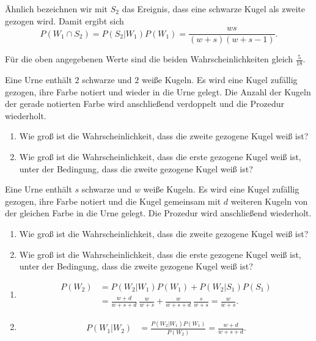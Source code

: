 Ähnlich bezeichnen wir mit $S_2$ das Ereignis, dass eine schwarze Kugel als zweite
gezogen wird. Damit ergibt sich
\begin{equation*}
    P(W_1 \cap S_2)= P(S_2 | W_1) P(W_1) = \frac{ w s }{(w+s)(w+s-1)}.
\end{equation*}

Für die oben angegebenen Werte sind die beiden Wahrscheinlichkeiten gleich
$\frac{5}{18}$.

 Eine Urne
enthält $2$ schwarze und $2$ weiße Kugeln. Es wird eine Kugel zufällig gezogen,
ihre Farbe notiert und wieder in die Urne gelegt. Die Anzahl der Kugeln der gerade notierten
Farbe wird anschließend verdoppelt und die Prozedur wiederholt. 
\begin{enumerate}
    \item Wie groß ist die Wahrscheinlichkeit, dass die zweite gezogene Kugel weiß ist?
    \item Wie groß ist die Wahrscheinlichkeit, dass die erste gezogene Kugel
        weiß ist, unter der Bedingung, dass die zweite gezogene Kugel weiß ist?
\end{enumerate}

 Eine Urne
enthält $s$ schwarze und $w$ weiße Kugeln. Es wird eine Kugel zufällig gezogen,
ihre Farbe notiert und die Kugel gemeinsam mit $d$ weiteren Kugeln von der
gleichen Farbe in die Urne gelegt. Die Prozedur wird anschließend wiederholt. 
\begin{enumerate}
    \item Wie groß ist die Wahrscheinlichkeit, dass die zweite gezogene Kugel weiß ist?
    \item Wie groß ist die Wahrscheinlichkeit, dass die erste gezogene Kugel
        weiß ist, unter der Bedingung, dass die zweite gezogene Kugel weiß ist?
\end{enumerate}

\solution
\begin{enumerate}
    \item \begin{align*}
            P(W_2) &= P(W_2 | W_1) P(W_1) + P(W_2 | S_1) P(S_1) \\
            &= \frac{w+d}{w+s+d}\ \frac{w}{w+s} + \frac{w}{w+s+d}\ \frac{s}{w+s} = \frac{w}{w+s}.
        \end{align*}

    \item \begin{align*}
            P(W_1 | W_2 ) &= \frac{ P(W_2 | W_1) P(W_1)  }{ P(W_2) } = \frac{w+d}{w+s+d}.
        \end{align*}
        
\end{enumerate}




